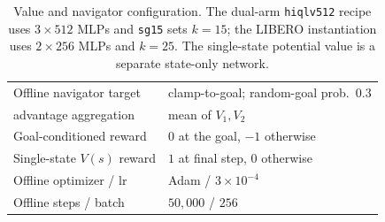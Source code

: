 \documentclass[letterpaper]{article} %
\begin{document}
\begin{table}[t]
\begin{tabular}{@{}p{}p{}@{}}
Offline navigator target             & clamp-to-goal; random-goal prob.\ $0.3$ \\
\quad advantage aggregation          & mean of $V_1,V_2$ \\
Goal-conditioned reward              & $0$ at the goal, $-1$ otherwise \\
Single-state $V(s)$ reward           & $1$ at final step, $0$ otherwise \\
Offline optimizer / lr               & Adam / $3{\times}10^{-4}$ \\
Offline steps / batch                & $50{,}000$ / $256$ \\
\bottomrule
\end{tabular}
\caption{Value and navigator configuration. The dual-arm
\texttt{hiqlv512} recipe uses $3\times512$ MLPs and \texttt{sg15} sets
$k=15$; the LIBERO instantiation uses $2\times256$ MLPs and $k=25$.
The single-state potential value is a separate state-only network.}
\label{tab:simvalue}
\end{table}
\end{document}
